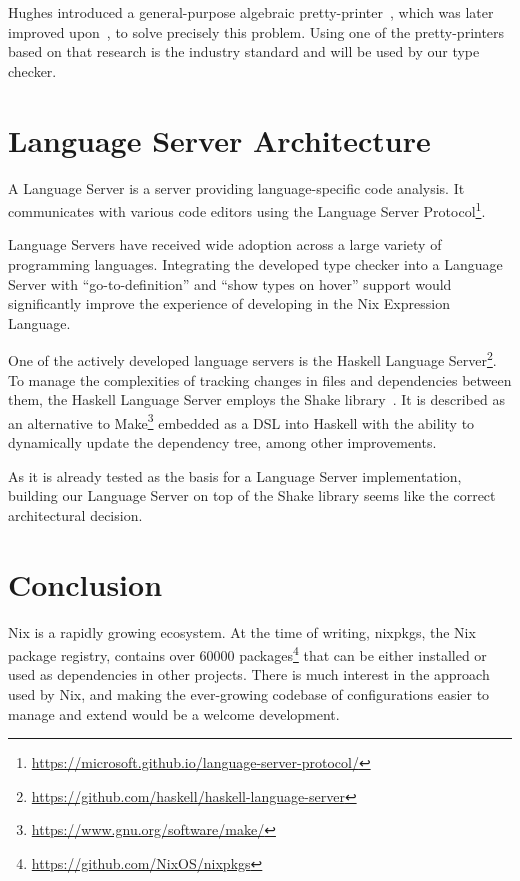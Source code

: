 \documentclass[a4paper,conference]{IEEEtran}
\begin{document}
Hughes introduced a general-purpose algebraic pretty-printer~\cite{hughes1995design}, which was later improved upon~\cite{wadler2003prettier}, to solve precisely this problem. Using one of the pretty-printers based on that research is the industry standard and will be used by our type checker.

\section{Language Server Architecture}

A Language Server is a server providing language-specific code analysis. It communicates with various code editors using the Language Server Protocol\footnote{\url{https://microsoft.github.io/language-server-protocol/}}.

Language Servers have received wide adoption across a large variety of programming languages. Integrating the developed type checker into a Language Server with ``go-to-definition'' and ``show types on hover'' support would significantly improve the experience of developing in the Nix Expression Language.

One of the actively developed language servers is the Haskell Language Server\footnote{\url{https://github.com/haskell/haskell-language-server}}. To manage the complexities of tracking changes in files and dependencies between them, the Haskell Language Server employs the Shake library~\cite{mitchell2012shake}. It is described as an alternative to Make\footnote{\url{https://www.gnu.org/software/make/}} embedded as a DSL into Haskell with the ability to dynamically update the dependency tree, among other improvements.

As it is already tested as the basis for a Language Server implementation, building our Language Server on top of the Shake library seems like the correct architectural decision.

\section{Conclusion}

Nix is a rapidly growing ecosystem. At the time of writing, nixpkgs, the Nix package registry, contains over 60000 packages\footnote{\url{https://github.com/NixOS/nixpkgs}} that can be either installed or used as dependencies in other projects. There is much interest in the approach used by Nix, and making the ever-growing codebase of configurations easier to manage and extend would be a welcome development.
\end{document}
